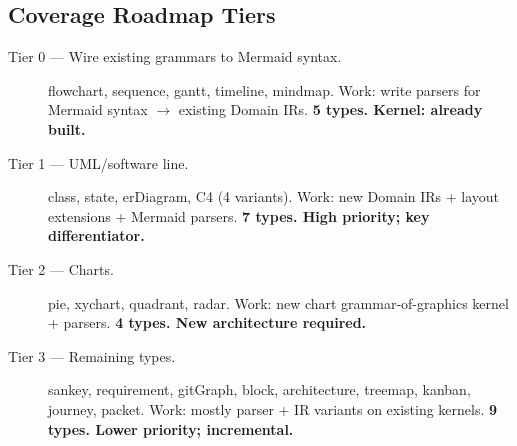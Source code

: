 \subsection{Coverage Roadmap Tiers}

\begin{description}
  \item[Tier 0 --- Wire existing grammars to Mermaid syntax.]
        flowchart, sequence, gantt, timeline, mindmap.
        Work: write parsers for Mermaid syntax $\to$ existing Domain IRs.
        \textbf{5 types. Kernel: already built.}

  \item[Tier 1 --- UML/software line.]
        class, state, erDiagram, C4 (4 variants).
        Work: new Domain IRs + layout extensions + Mermaid parsers.
        \textbf{7 types. High priority; key differentiator.}

  \item[Tier 2 --- Charts.]
        pie, xychart, quadrant, radar.
        Work: new chart grammar-of-graphics kernel + parsers.
        \textbf{4 types. New architecture required.}

  \item[Tier 3 --- Remaining types.]
        sankey, requirement, gitGraph, block, architecture, treemap, kanban, journey, packet.
        Work: mostly parser + IR variants on existing kernels.
        \textbf{9 types. Lower priority; incremental.}
\end{description}
